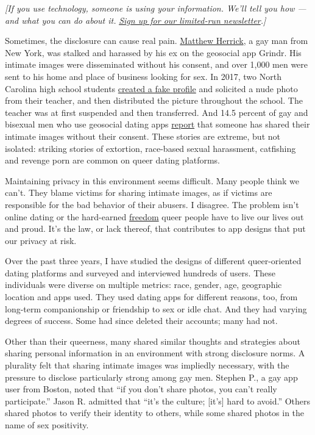 \emph{{[}If you use technology, someone is using your information. We'll
tell you how --- and what you can do about it.}
\href{https://www.nytimes.com/newsletters/privacy-project?action=click\&module=Intentional\&pgtype=Article}{\emph{Sign
up for our limited-run newsletter}}\emph{.{]}}

Sometimes, the disclosure can cause real pain.
\href{https://www.cagoldberglaw.com/matthew-herrick-v-grindr-llc/}{Matthew
Herrick}, a gay man from New York, was stalked and harassed by his ex on
the geosocial app Grindr. His intimate images were disseminated without
his consent, and over 1,000 men were sent to his home and place of
business looking for sex. In 2017, two North Carolina high school
students
\href{http://www.towleroad.com/2017/05/catfish-teacher/}{created a fake
profile} and solicited a nude photo from their teacher, and then
distributed the picture throughout the school. The teacher was at first
suspended and then transferred. And 14.5 percent of gay and bisexual men
who use geosocial dating apps
\href{https://www.cambridge.org/core/journals/law-and-social-inquiry/article/law-privacy-and-online-dating-revenge-porn-in-gay-online-communities/BCCE05CF25AA4C2E05CCF8D64980E839/core-reader}{report}
that someone has shared their intimate images without their consent.
These stories are extreme, but not isolated: striking stories of
extortion, race-based sexual harassment, catfishing and revenge porn are
common on queer dating platforms.

Maintaining privacy in this environment seems difficult. Many people
think we can't. They blame victims for sharing intimate images, as if
victims are responsible for the bad behavior of their abusers. I
disagree. The problem isn't online dating or the hard-earned
\href{https://supreme.justia.com/cases/federal/us/539/558/}{freedom}
queer people have to live our lives out and proud. It's the law, or lack
thereof, that contributes to app designs that put our privacy at risk.

Over the past three years, I have studied the designs of different
queer-oriented dating platforms and surveyed and interviewed hundreds of
users. These individuals were diverse on multiple metrics: race, gender,
age, geographic location and apps used. They used dating apps for
different reasons, too, from long-term companionship or friendship to
sex or idle chat. And they had varying degrees of success. Some had
since deleted their accounts; many had not.

Other than their queerness, many shared similar thoughts and strategies
about sharing personal information in an environment with strong
disclosure norms. A plurality felt that sharing intimate images was
impliedly necessary, with the pressure to disclose particularly strong
among gay men. Stephen P., a gay app user from Boston, noted that ``if
you don't share photos, you can't really participate.'' Jason R.
admitted that ``it's the culture; {[}it's{]} hard to avoid.'' Others
shared photos to verify their identity to others, while some shared
photos in the name of sex positivity.

